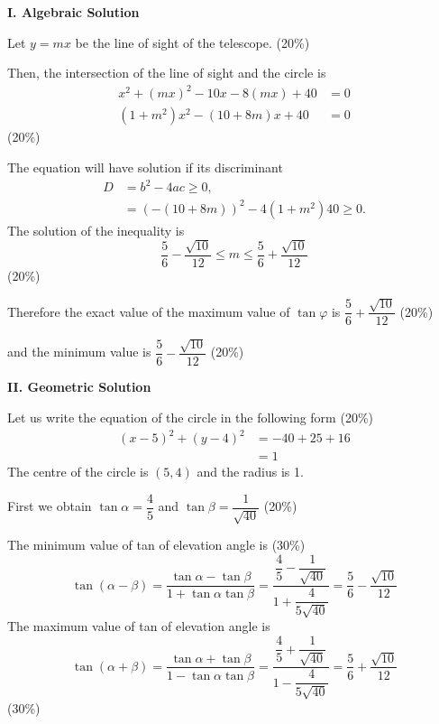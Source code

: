 \textbf{I. Algebraic Solution}

Let $y = mx$ be the line of sight of the telescope. \hfill(20\%)

Then, the intersection of the line of sight and the circle is
\begin{align*}
x^2 + (mx)^2 - 10x - 8(mx) + 40 &= 0\\
\left(1+m^2\right)x^2 - (10+8m)x + 40 &= 0
\end{align*}
\hfill(20\%)

The equation will have solution if its discriminant
\begin{align*}
D &= b^2 - 4ac \ge 0,\\
  &= (-(10+8m))^2 - 4(1+m^2)40 \ge 0.
\end{align*}
The solution of the inequality is
\[
\frac{5}{6} - \frac{\sqrt{10}}{12} \le m \le
\frac{5}{6} + \frac{\sqrt{10}}{12}
\]
\hfill(20\%)

Therefore the exact value of the maximum value of $\tan\varphi$ is
$\dfrac{5}{6} + \dfrac{\sqrt{10}}{12}$ \hfill(20\%)

and the minimum value is $\dfrac{5}{6} - \dfrac{\sqrt{10}}{12}$ \hfill(20\%)

\textbf{II. Geometric Solution}

Let us write the equation of the circle in the following form \hfill(20\%)
\begin{align*}
(x-5)^2 + (y-4)^2 &= -40 + 25 + 16\\
                  &= 1
\end{align*}
The centre of the circle is $(5,4)$ and the radius is 1.

First we obtain $\tan\alpha = \dfrac{4}{5}$ and
$\tan\beta = \dfrac{1}{\sqrt{40}}$ \hfill(20\%)

The minimum value of tan of elevation angle is \hfill(30\%)
\[
\tan(\alpha-\beta) = \frac{\tan\alpha - \tan\beta}{1 + \tan\alpha\tan\beta}
 = \frac{\dfrac{4}{5} - \dfrac{1}{\sqrt{40}}}{1 + \dfrac{4}{5\sqrt{40}}}
 = \frac{5}{6} - \frac{\sqrt{10}}{12}
\]
The maximum value of tan of elevation angle is
\[
\tan(\alpha+\beta) = \frac{\tan\alpha + \tan\beta}{1 - \tan\alpha\tan\beta}
 = \frac{\dfrac{4}{5} + \dfrac{1}{\sqrt{40}}}{1 - \dfrac{4}{5\sqrt{40}}}
 = \frac{5}{6} + \frac{\sqrt{10}}{12}
\]
\hfill(30\%)
